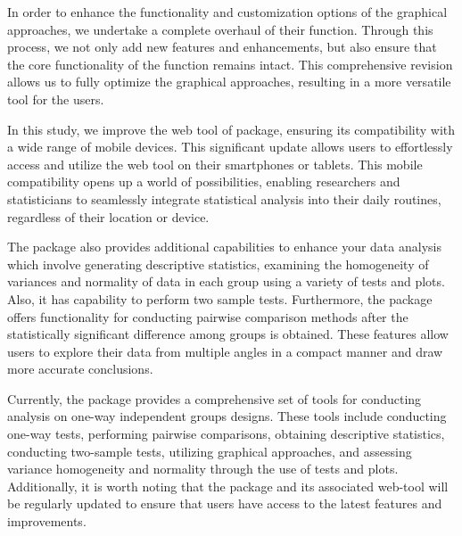 In order to enhance the functionality and customization options of the graphical approaches, we undertake a complete overhaul of their function. Through this process, we not only add new features and enhancements, but also ensure that the core functionality of the function remains intact. This comprehensive revision allows us to fully optimize the graphical approaches, resulting in a more versatile tool for the users. 

In this study, we improve the web tool of  package, ensuring its compatibility with a wide range of mobile devices. This significant update allows users to effortlessly access and utilize the web tool on their smartphones or tablets. This mobile compatibility opens up a world of possibilities, enabling researchers and statisticians to seamlessly integrate statistical analysis into their daily routines, regardless of their location or device. 

The  package also provides additional capabilities to enhance your data analysis which involve generating descriptive statistics, examining the homogeneity of variances and normality of data in each group using a variety of tests and plots. Also, it has capability to perform two sample tests. Furthermore, the package offers functionality for conducting pairwise comparison methods after the statistically significant difference among groups is obtained. These features allow users to explore their data from multiple angles in a compact manner and draw more accurate conclusions. 

Currently, the  package provides a comprehensive set of tools for conducting analysis on one-way independent groups designs. These tools include conducting one-way tests, performing pairwise comparisons, obtaining descriptive statistics, conducting two-sample tests, utilizing graphical approaches, and assessing variance homogeneity and normality through the use of tests and plots. Additionally, it is worth noting that the package and its associated web-tool will be regularly updated to ensure that users have access to the latest features and improvements.



\address{Merve Kasikci\\
  Department of Biostatistics\\
  Hacettepe University Faculty of Medicine, Sihhiye, Ankara\\
  Turkey\\
\href{mailto:mervekasikci@outlook.com}{\nolinkurl{mervekasikci@outlook.com}}}

